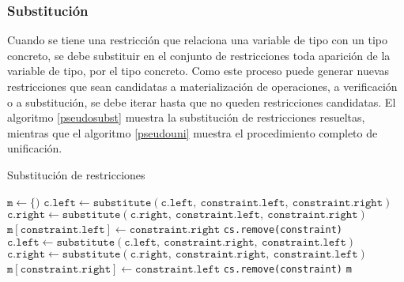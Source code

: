 \subsubsection{Substitución}
Cuando se tiene una restricción que relaciona una variable de tipo con un tipo concreto, se debe substituir en el conjunto de restricciones toda aparición de la variable de tipo, por el tipo concreto. Como este proceso puede generar nuevas restricciones que sean candidatas a materialización de operaciones, a verificación o a substitución, se debe iterar hasta que no queden restricciones candidatas. El algoritmo \ref{pseudosubst} muestra la substitución de restricciones resueltas, mientras que el algoritmo \ref{pseudouni} muestra el procedimiento completo de unificación.
\begin{algorithm}\captionsetup{labelsep=newline}
  \centering
  \caption{Substitución de restricciones}
  \label{pseudosubst}
    \begin{algorithmic}[1]
          \State $\mathtt{m\gets \{)}$
                \State $\mathtt{c.left\gets substitute(c.left,\ constraint.left,\ constraint.right)}$
                \State $\mathtt{c.right\gets substitute(c.right,\ constraint.left,\ constraint.right)}$
              \EndFor
              \State $\mathtt{m[constraint.left]\gets constraint.right}$
              \State \texttt{cs.remove(constraint)}
            \EndIf
                \State $\mathtt{c.left\gets substitute(c.left,\ constraint.right,\ constraint.left)}$
                \State $\mathtt{c.right\gets substitute(c.right,\ constraint.right,\ constraint.left)}$
              \EndFor
              \State $\mathtt{m[constraint.right]\gets constraint.left}$
              \State \texttt{cs.remove(constraint)}
            \EndIf
          \EndFor
          \State \Return \texttt{m}
      \EndFunction
    \end{algorithmic}
\end{algorithm}

